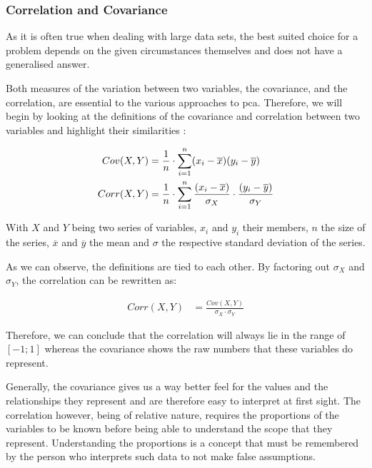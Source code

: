 \clearpage



\subsubsection{Correlation and Covariance} \label{section:correlationANDcovariance}

As it is often true when dealing with large data sets, the best suited choice for a problem depends on the given circumstances themselves and does not have a generalised answer.

Both measures of the variation between two variables, the covariance, and the correlation, are essential to the various approaches to \gls{pca}.
Therefore, we will begin by looking at the definitions of the covariance and correlation between two variables and highlight their similarities \cite{downey2011think}:


\vspace{-28mm}
{
\begin{align}
	\label{formula:covariance}
	Cov(X,Y) &= \frac{1}{n} \cdot \displaystyle\sum_{i=1}^{n} (x_i - \overline{x})(y_i - \overline{y})\bigskip
	\\
	\label{formula:correlation}
	Corr(X,Y) &= \frac{1}{n} \cdot \displaystyle\sum_{i=1}^{n} \frac{(x_i - \overline{x})}{\sigma_X}\cdot\frac{(y_i - \overline{y})}{\sigma_Y}
\end{align}
}

\vspace{-10mm}
With $X$ and $Y$ being two series of variables, $x_i$ and $y_i$ their members, $n$ the size of the series, $\overline{x}$ and $\overline{y}$ the mean and $\sigma$ the respective standard deviation of the series.

As we can observe, the definitions are tied to each other. By factoring out $\sigma_X$ and $\sigma_Y$, the correlation can be rewritten as:

\vspace{-6mm}
\begin{align}
	\label{formula:covarianceFTcorrelation}
	Corr(X,Y) &= \frac{Cov(X,Y)}{\sigma_X \cdot \sigma_Y}
\end{align}

Therefore, we can conclude that the correlation will always lie in the range of $[-1;1]$ whereas the covariance shows the raw numbers that these variables do represent.
\bigskip


Generally, the covariance gives us a way better feel for the values and the relationships they represent and are therefore easy to interpret at first sight.
The correlation however, being of relative nature, requires the proportions of the variables to be known before being able to understand the scope that they represent.
Understanding the proportions is a concept that must be remembered by the person who interprets such data to not make false assumptions.

